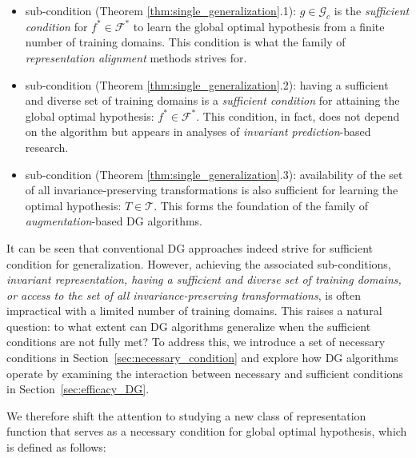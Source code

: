 \begin{itemize}
    \item sub-condition (Theorem \ref{thm:single_generalization}.1): $g \in \mathcal{G}_c$ 
    is the \textit{sufficient condition} for 
    $f^* \in \mathcal{F}^*$ 
    to learn the global optimal hypothesis from a finite number of training domains. This condition is what the family of \textit{representation alignment} methods strives for.

     \item sub-condition (Theorem \ref{thm:single_generalization}.2): having a sufficient and diverse set of training domains is a \textit{sufficient condition} for attaining the global optimal hypothesis:
    $f^* \in \mathcal{F}^*$.
    This condition, in fact, does not depend on the algorithm but appears in analyses of \textit{invariant prediction}-based research.

     \item sub-condition (Theorem \ref{thm:single_generalization}.3): availability of the set of all invariance-preserving transformations is also sufficient for learning the optimal hypothesis:
    $T \in \mathcal{T}$.
    This forms the foundation of the family of \textit{augmentation}-based DG algorithms.
\end{itemize}

It can be seen that conventional DG approaches indeed strive for sufficient condition for generalization. However, achieving the associated sub-conditions, \textit{invariant representation, having a sufficient and diverse set of training domains, or access to the set of all invariance-preserving transformations}, is often impractical with a limited number of training domains. This raises a natural question: to what extent can DG algorithms generalize when the sufficient conditions are not fully met? To address this, we introduce a set of necessary conditions in Section~\ref{sec:necessary_condition} and explore how DG algorithms operate by examining the interaction between necessary and sufficient conditions in Section~\ref{sec:efficacy_DG}.





We therefore shift the attention to studying a new class of
representation function that serves as a necessary condition for global optimal hypothesis, which is
defined as follows:

